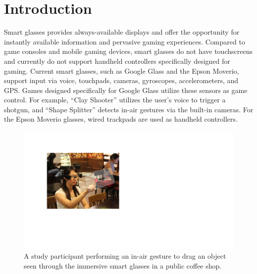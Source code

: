 \documentclass{sigchi}
\begin{document}
\section{Introduction}

Smart glasses provides always-available displays and offer the opportunity for instantly available information and pervasive gaming experiences. 
Compared to game consoles and mobile gaming devices, smart glasses do not have touchscreens and currently do not support handheld controllers specifically designed for gaming.
Current smart glasses, such as Google Glass and the Epson Moverio, support input via voice, touchpads, cameras, gyroscopes, accelerometers, and GPS.
Games designed specifically for Google Glass \cite{MiniGames} utilize these sensors as game control. 
For example, ``Clay Shooter'' utilizes the user's voice to trigger a shotgun, and ``Shape Splitter'' detects in-air gestures via the built-in cameras. 
For the Epson Moverio glasses, wired trackpads are used as handheld controllers.


 \begin{figure}[!t]
  \centering
  \includegraphics[width=0.8\columnwidth]{TopFigure2.pdf}
  \caption{A study participant performing an in-air gesture to drag an object seen through the immersive smart glasses in a public coffee shop.}
  \label{fig:TopFigure}
  \end{figure} 
\end{document}
